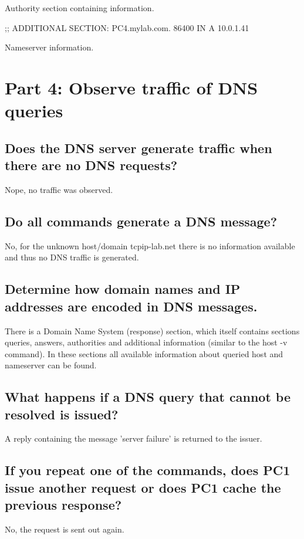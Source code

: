 \documentclass[a4paper, 11pt]{article}
\begin{document}
Authority section containing information.

;; ADDITIONAL SECTION: PC4.mylab.com.		86400	IN	A	10.0.1.41

Nameserver information.


\section{Part 4: Observe traffic of DNS queries}

\subsection {Does the DNS server generate traffic when there are no DNS requests? }

Nope, no traffic was observed.

\subsection {Do all commands generate a DNS message? }

No, for the unknown host/domain tcpip-lab.net there is no information available and thus no DNS traffic is generated.

\subsection {Determine how domain names and IP addresses are encoded in DNS messages. }

There is a Domain Name System (response) section, which itself contains sections queries, answers, authorities and additional information (similar to the host -v command). In these sections all available information about queried host and nameserver can be found.

\subsection {What happens if a DNS query that cannot be resolved is issued? }

A reply containing the message 'server failure' is returned to the issuer.

\subsection {If you repeat one of the commands, does PC1 issue another request or does PC1 cache the previous response? }

No, the request is sent out again.
\end{document}
